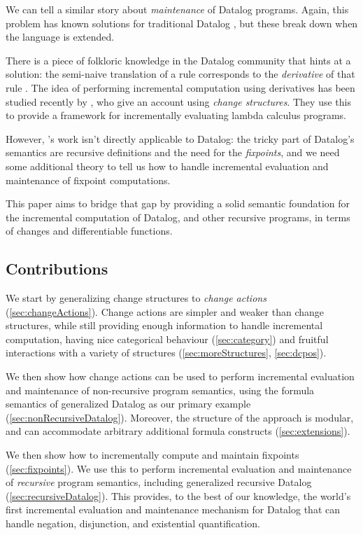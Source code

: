 We can tell a similar story about \emph{maintenance} of Datalog programs. Again,
this problem has known solutions for traditional Datalog
\autocite{gupta1993maintaining}, but these break down when the language is extended.

There is a piece of folkloric knowledge in the Datalog community that hints at a
solution: the semi-naive translation of a rule corresponds to the
\emph{derivative} of that rule \autocites{bancilhon1986naive}[section
3.2.2]{bancilhon1986amateur}. The idea of performing incremental computation using derivatives has been
studied recently by \textcite{cai2014changes}, who give an account using
\emph{change structures}. They use this to provide a framework for incrementally evaluating lambda calculus programs.

However, \citeauthor{cai2014changes}'s work isn't directly applicable to Datalog: the tricky part
of Datalog's semantics are recursive definitions and the need for the \emph{fixpoints}, and we need some additional theory to tell us how to
handle incremental evaluation and maintenance of fixpoint computations.

This paper aims to bridge that gap by providing a solid semantic foundation for the incremental
computation of Datalog, and other recursive programs, in terms of changes and
differentiable functions.

\subsection{Contributions}

We start by generalizing change structures to
\emph{change actions} (\cref{sec:changeActions}). Change actions are simpler and weaker than change
structures, while still providing enough information to handle incremental computation,
having nice categorical behaviour (\cref{sec:category}) and fruitful
interactions with a variety of structures (\cref{sec:moreStructures}, \cref{sec:dcpos}).

We then show how change actions can be used to perform incremental evaluation and maintenance
of non-recursive program semantics, using the formula semantics of generalized Datalog as our primary
example (\cref{sec:nonRecursiveDatalog}). Moreover, the structure of the
approach is modular, and can accommodate arbitrary additional
formula constructs (\cref{sec:extensions}).

We then show how to incrementally compute and maintain fixpoints
(\cref{sec:fixpoints}). We use this to perform incremental evaluation and
maintenance of \emph{recursive} program semantics, including generalized
recursive Datalog (\cref{sec:recursiveDatalog}). This provides, to the best
of our knowledge, the world's first incremental
evaluation and maintenance mechanism for Datalog that can handle negation,
disjunction, and existential quantification. 


